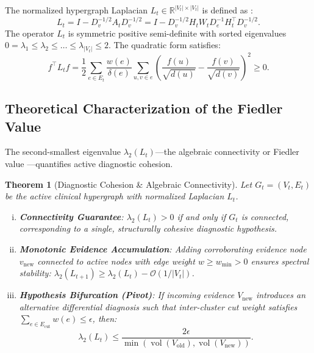 \documentclass[10pt, onecolumn]{article}
\newtheorem{theorem}{Theorem}[section]
\DeclareMathOperator{\vol}{vol}
\newcommand{\R}{\mathbb{R}}
\begin{document}
The normalized hypergraph Laplacian $L_t \in \R^{|V_t| \times |V_t|}$ is defined as \cite{chung1997spectral}:
\begin{equation}
  L_t = I - D_v^{-1/2} A_t D_v^{-1/2} = I - D_v^{-1/2} H_t W_t D_e^{-1} H_t^\top D_v^{-1/2}.
  \label{eq:norm_laplacian}
\end{equation}
The operator $L_t$ is symmetric positive semi-definite with sorted eigenvalues $0 = \lambda_1 \le \lambda_2 \le \dots \le \lambda_{|V_t|} \le 2$. The quadratic form satisfies:
\begin{equation}
  f^\top L_t f = \frac{1}{2} \sum_{e \in E_t} \frac{w(e)}{\delta(e)} \sum_{u, v \in e} \left( \frac{f(u)}{\sqrt{d(u)}} - \frac{f(v)}{\sqrt{d(v)}} \right)^2 \ge 0.
  \label{eq:laplacian_quad}
\end{equation}

\subsection{Theoretical Characterization of the Fiedler Value}
The second-smallest eigenvalue $\lambda_2(L_t)$—the algebraic connectivity or Fiedler value \cite{fiedler1973algebraic}—quantifies active diagnostic cohesion.

\begin{theorem}[Diagnostic Cohesion \& Algebraic Connectivity]
\label{thm:fiedler_cohesion}
Let $G_t = (V_t, E_t)$ be the active clinical hypergraph with normalized Laplacian $L_t$.
\begin{enumerate}[(i)]
  \item \textbf{Connectivity Guarantee}: $\lambda_2(L_t) > 0$ if and only if $G_t$ is connected, corresponding to a single, structurally cohesive diagnostic hypothesis.
  \item \textbf{Monotonic Evidence Accumulation}: Adding corroborating evidence node $v_{\text{new}}$ connected to active nodes with edge weight $w \ge w_{\min} > 0$ ensures spectral stability: $\lambda_2(L_{t+1}) \ge \lambda_2(L_t) - \mathcal{O}(1/|V_t|)$.
  \item \textbf{Hypothesis Bifurcation (Pivot)}: If incoming evidence $V_{\text{new}}$ introduces an alternative differential diagnosis such that inter-cluster cut weight satisfies $\sum_{e \in E_{\text{cut}}} w(e) \le \epsilon$, then:
  \begin{equation}
    \lambda_2(L_t) \le \frac{2 \epsilon}{\min(\vol(V_{\text{old}}), \vol(V_{\text{new}}))}.
    \label{eq:spectral_gap_drop}
  \end{equation}
\end{enumerate}
\end{theorem}
\end{document}
